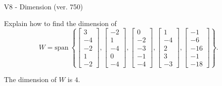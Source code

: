 \begin{exercise}
  \begin{exerciseTitle}V8 - Dimension (ver. 750)\end{exerciseTitle}
  \begin{exerciseStatement}
    Explain how to find the dimension of 
\[W=\mathrm{span}\ \left\{\left[\begin{array}{r}
3 \\
-4 \\
-2 \\
1 \\
-2
\end{array}\right] , \left[\begin{array}{r}
-2 \\
1 \\
-4 \\
0 \\
-4
\end{array}\right] , \left[\begin{array}{r}
0 \\
-2 \\
-3 \\
-1 \\
-4
\end{array}\right] , \left[\begin{array}{r}
1 \\
-4 \\
2 \\
3 \\
-3
\end{array}\right] , \left[\begin{array}{r}
-1 \\
-6 \\
-16 \\
-1 \\
-18
\end{array}\right]\right\}.\]



  \end{exerciseStatement}
  \begin{exerciseAnswer}
   The dimension of \(W\) is  \(4\).
  


  \end{exerciseAnswer}
\end{exercise}